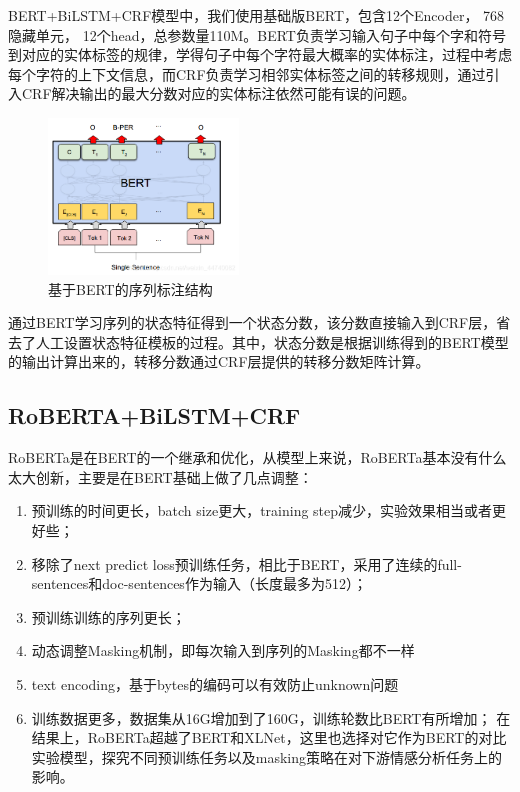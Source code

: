 \documentclass[a4paper, 12pt]{article}
\begin{document}
BERT+BiLSTM+CRF模型中，我们使用基础版BERT，包含12个Encoder， 768隐藏单元， 12个head，总参数量110M。BERT负责学习输入句子中每个字和符号到对应的实体标签的规律，学得句子中每个字符最大概率的实体标注，过程中考虑每个字符的上下文信息，而CRF负责学习相邻实体标签之间的转移规则，通过引入CRF解决输出的最大分数对应的实体标注依然可能有误的问题。

\begin{figure}[htbp]
    \centering
    \includegraphics[width=0.45\textwidth]{bert}
    \caption{基于BERT的序列标注结构}
    \label{fig:encoder}
\end{figure}

通过BERT学习序列的状态特征得到一个状态分数，该分数直接输入到CRF层，省去了人工设置状态特征模板的过程。其中，状态分数是根据训练得到的BERT模型的输出计算出来的，转移分数通过CRF层提供的转移分数矩阵计算。



\subsection{RoBERTA+BiLSTM+CRF} %
\label{sub:roberta}
RoBERTa\cite{liu2019roberta}是在BERT的一个继承和优化，从模型上来说，RoBERTa基本没有什么太大创新，主要是在BERT基础上做了几点调整：

\begin{enumerate}
    \item 预训练的时间更长，batch size更大，training step减少，实验效果相当或者更好些；
    \item 移除了next predict loss预训练任务，相比于BERT，采用了连续的full-sentences和doc-sentences作为输入（长度最多为512）；
    \item 预训练训练的序列更长；
    \item 动态调整Masking机制，即每次输入到序列的Masking都不一样
    \item text encoding，基于bytes的编码可以有效防止unknown问题
    \item 训练数据更多，数据集从16G增加到了160G，训练轮数比BERT有所增加；
    在结果上，RoBERTa超越了BERT和XLNet，这里也选择对它作为BERT的对比实验模型，探究不同预训练任务以及masking策略在对下游情感分析任务上的影响。
\end{enumerate}
\end{document}
